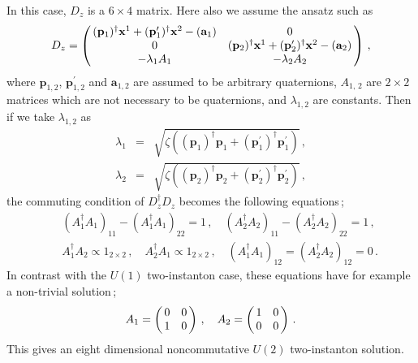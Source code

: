 \documentclass[a4paper,12pt]{article}
\begin{document}
In this case, $D_z$ is a $6\times 4$ matrix.
Here also we assume the ansatz such as
\begin{equation}
D_z =
\left( \begin{array}{@{\,}cc@{\,}}
 (\mathbf{p}_1)^{\dagger}\mathbf{x}^1 +(\mathbf{p}^{\prime}_1 )^{\dagger}
\mathbf{x}^2 -(\mathbf{a}_1) & 0 \\
0 & (\mathbf{p}_2 )^{\dagger} \mathbf{x}^1 +(\mathbf{p}^{\prime}_2) ^{\dagger}
\mathbf{x}^2 -(\mathbf{a}_2) \\
   -\lambda_1 A_{1}  &  -\lambda_2 A_{2}  
  \end{array}  \right)\,,\label{eq:4.33}
\end{equation}
where $\mathbf{p}_{1,2}$, $\mathbf{p}^{\prime}_{1,2}$ 
and $\mathbf{a}_{1,2}$ are assumed 
to be arbitrary quaternions, $A_{1,\,2}$ are $2\times 2$ matrices 
which are not necessary to 
be quaternions, and $\lambda_{1,2}$ are constants.
Then if we take $\lambda_{1,2}$ as 
\begin{eqnarray}
\lambda _1 &=& \sqrt{ \zeta \left(   
(\mathbf{p}_{1})^{\dagger}\mathbf{p}_{1} + (\mathbf{p}_{1}^{\prime})^{\dagger}
\mathbf{p}_{1}^{\prime} \right)}\,,\\
\lambda _2 &=& \sqrt{ \zeta \left( 
(\mathbf{p}_{2})^{\dagger}\mathbf{p}_{2} + (\mathbf{p}_{2}^{\prime})^{\dagger}
\mathbf{p}_{2}^{\prime} \right)}\,,
\end{eqnarray}
the commuting condition of $D_z^{\dagger}D_z$ becomes the following 
equations\,;
\begin{eqnarray}
& &  (A_{1}^{\dagger}A_{1})_{11}-(A_{1}^{\dagger}A_{1})_{22} = 1 \,,
\quad (A_{2}^{\dagger}A_{2})_{11}-(A_{2}^{\dagger}A_{2})_{22}  = 1 \,, \\
& & A_{1}^{\dagger}A_{2}\propto 1_{2\times 2}\,,\quad 
 A_{2}^{\dagger}A_{1}\propto 1_{2\times 2}\,,\quad 
(A_{1}^{\dagger}A_{1})_{12}=(A_{2}^{\dagger}A_{2})_{12}=0\,.
\end{eqnarray}
In contrast with the $U(1)$ two-instanton case, 
these equations have for example a non-trivial solution\,;
\begin{equation}
A_{1} = \left( \begin{array}{@{\,}cc@{\,}}
   0   &    0     \\
   1   &    0 
  \end{array}  \right)\,,\quad  A_{2} =
\left( \begin{array}{@{\,}cc@{\,}}
   1   &    0     \\
   0   &    0 
  \end{array}  \right)\,.
\end{equation}
 This gives an eight dimensional noncommutative 
$U(2)$ two-instanton solution.
\end{document}
